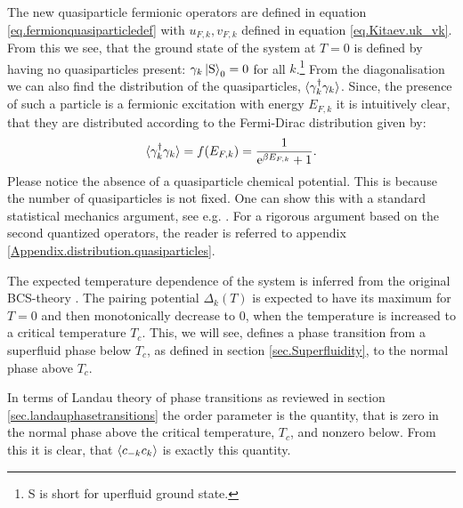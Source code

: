 The new quasiparticle fermionic operators are defined in equation \eqref{eq.fermionquasiparticledef} with $u_{F,k},v_{F,k}$ defined in equation \eqref{eq.Kitaev.uk_vk}. From this we see, that the ground state of the system at $T = 0$ is defined by having no quasiparticles present: $\gamma_k \ket{\text{S}}_0 = 0$ for all $k$.\footnote{S is short for uperfluid ground state.} From the diagonalisation we can also find the distribution of the quasiparticles, $\braket{\gamma^\dagger_k\gamma_k}$. Since, the presence of such a particle is a fermionic excitation with energy $E_{F,k}$ it is intuitively clear, that they are distributed according to the Fermi-Dirac distribution given by:
\begin{equation}
\braket{\gamma^\dagger_k \gamma_k} = f(E_{F,k}) = \frac{1}{\text{e}^{\beta E_{F,k}} + 1}. 
\label{eq.Distribution.quasiparticles}
\end{equation}
Please notice the absence of a quasiparticle chemical potential. This is because the number of quasiparticles is not fixed. One can show this with a standard statistical mechanics argument, see e.g. \cite[p. 225]{SchroederThermal}. For a rigorous argument based on the second quantized operators, the reader is referred to appendix \ref{Appendix.distribution.quasiparticles}. 

The expected temperature dependence of the system is inferred from the original BCS-theory \cite[chapter 3]{Tinkham}. The pairing potential $\Delta_k(T)$ is expected to have its maximum for $T = 0$ and then monotonically decrease to 0, when the temperature is increased to a critical temperature $T_c$. This, we will see, defines a phase transition from a superfluid phase below $T_c$, as defined in section \ref{sec.Superfluidity}, to the normal phase above $T_c$. 

In terms of Landau theory of phase transitions as reviewed in section \ref{sec.landauphasetransitions} the order parameter is the quantity, that is zero in the normal phase above the critical temperature, $T_c$, and nonzero below. From this it is clear, that $\braket{c_{-k}c_k}$ is exactly this quantity.

